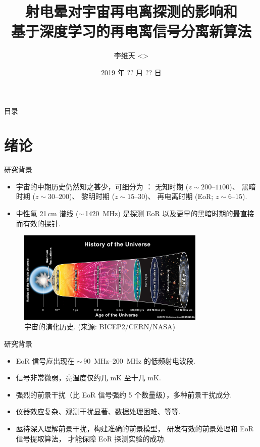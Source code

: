 \documentclass{beamer}
\title[探测宇宙再电离时期]{%
  射电晕对宇宙再电离探测的影响和\texorpdfstring{\\}{}%
  基于深度学习的再电离信号分离新算法%
}
\author[李维天]{李维天 <\email{liweitianux@sjtu.edu.cn}>}
\institute{%
  物理与天文学院\\%
  上海交通大学%
}
\date{\small 2019 年 ?? 月 ?? 日}
\begin{document}
\maketitle

\begin{frame}{目\cspace{}录}
  \tableofcontents[hideallsubsections]
\end{frame}


\section{绪论}

\begin{frame}{研究背景}
  \begin{itemize}
    \item 宇宙的中期历史仍然知之甚少，可细分为 \cite{koopmans2015}：
      无知时期 ($z \sim \numrange{200}{1100}$)、
      黑暗时期 ($z \sim \numrange{30}{200}$)、
      黎明时期 ($z \sim \numrange{15}{30}$)、
      再电离时期 (EoR; $z \sim \numrange{6}{15}$).
    \item 中性氢 21\,cm 谱线 ($\sim$\,\SI{1420}{\MHz})
      是探测 EoR 以及更早的黑暗时期的最直接而有效的探针.
  \end{itemize}

  \begin{figure}
    \centering
    \includegraphics[width=0.8\textwidth]{universe-history}
    \caption{宇宙的演化历史. (来源: BICEP2/CERN/NASA)}
  \end{figure}
\end{frame}

\begin{frame}{研究背景}
  \begin{itemize}
    \item EoR 信号应出现在 $\sim$\,\SIrange{90}{200}{\MHz} 的低频射电波段.
    \item 信号非常微弱，亮温度仅约几 mK 至十几 mK.
    \item 强烈的前景干扰（比 EoR 信号强约 5 个数量级），多种前景干扰成分.
    \item 仪器效应复杂、观测干扰显著、数据处理困难、等等.
    \item 亟待深入理解前景干扰，构建准确的前景模型，
      研发有效的前景处理和 EoR 信号提取算法，
      才能保障 EoR 探测实验的成功.
  \end{itemize}
\end{frame}
\end{document}
